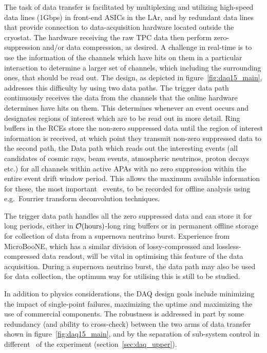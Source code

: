The task of data transfer is facilitated by multiplexing and utilizing
high-speed data lines (1Gbps) in front-end ASICs in the LAr, and by
redundant  data lines that
provide connection to data-acquisition hardware located outside the
cryostat.  The hardware receiving the raw TPC data then perform
zero-suppression and/or data compression, as desired.  A challenge in
real-time is to use the information of the channels which have hits on
them in a particular interaction to determine a larger set of
channels, which including the surrounding ones, that should be read
out.  The design, as depicted in figure~\ref{fig:daq15_main},
addresses this difficulty by using two data paths.  The trigger data
path continuously receives the data from the channels that the online
hardware determines have hits on them.  This determines whenever an
event occurs and designates regions of interest which are to be read
out in more detail.  Ring buffers in the RCEs store the non-zero
suppressed data until the region of interest information is received,
at which point they transmit non-zero suppressed data to the second
path, the Data path which reads out the interesting events (all
candidates of cosmic rays, beam events, atmospheric neutrinos, proton
decays etc.) for all channels within active APAs with no zero
suppression within the entire event drift window period.  This allows
the maximum available information for these, the most important \LBNE\
events, to be recorded for offline analysis using e.g.\ Fourrier
transform deconvolution techniques.

The trigger data path handles all the zero suppressed data and can
store it for long periods, either in ${\cal O}(\mathrm{hours})$-long
ring buffers or in permanent offline storage for collection of data
from a supernova neutrino burst.  Experience from MicroBooNE, which
has a similar division of lossy-compressed and lossless-compressed
data readout, will be vital in optimising this feature of the data
acquisition.  During a supernova neutrino burst, the data path may
also be used for data collection, the optimum way for utilising this
is still to be studied.

In addition to physics considerations, the DAQ design goals include
minimizing the impact of single-point failures, maximizing the uptime
and maximizing the use of commercial components.  The robustness is
addressed in part by some redundancy (and ability to cross-check)
between the two arms of data transfer shown in
figure~\ref{fig:daq15_main}, and by the separation of sub-system
control in different \COMPARTMENTS\ of the experiment
(section~\ref{sec:daq_upper}).

